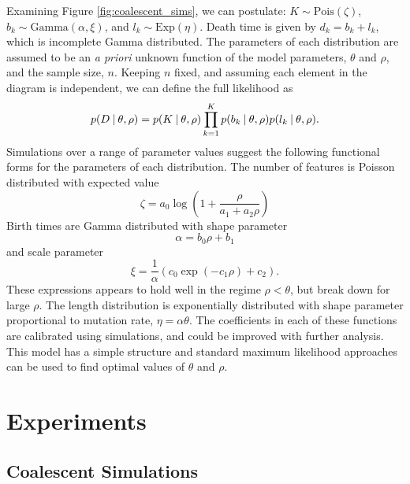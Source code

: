 Examining Figure \ref{fig:coalescent_sims}, we can postulate: $K \sim \mathrm{Pois}(\zeta)$, $b_k \sim \mathrm{Gamma}(\alpha,\xi)$, and $l_k \sim \mathrm{Exp}(\eta)$.
Death time is given by $d_k=b_k+l_k$, which is incomplete Gamma distributed.
The parameters of each distribution are assumed to be an \emph{a priori} unknown function of the model parameters, $\theta$ and $\rho$, and the sample size, $n$.
Keeping $n$ fixed, and assuming each element in the diagram is independent, we can define the full likelihood as
\begin{equation}
p(D \:\vert\: \theta,\rho) = p(K \:\vert\: \theta,\rho)\displaystyle\prod_{k=1}^{K}p(b_k \:\vert\: \theta,\rho)p(l_k  \:\vert\: \theta,\rho).
\end{equation}
Simulations over a range of parameter values suggest the following functional forms for the parameters of each distribution.
The number of features is Poisson distributed with expected value
\begin{equation}
\zeta=a_{0}\log\left(1+\frac{\rho}{a_{1}+a_{2}\rho}\right)
\end{equation}
Birth times are Gamma distributed with shape parameter
\begin{equation}
\alpha=b_{0}\rho+b_{1}
\end{equation}
and scale parameter
\begin{equation}
\xi = \frac{1}{\alpha}(c_{0}\exp(-c_{1}\rho)+c_{2}).
\end{equation}
These expressions appears to hold well in the regime $\rho<\theta$, but break down for large $\rho$.
The length distribution is exponentially distributed with shape parameter proportional to mutation rate, $\eta=\alpha\theta$.
The coefficients in each of these functions are calibrated using simulations, and could be improved with further analysis.
This model has a simple structure and standard maximum likelihood approaches can be used to find optimal values of $\theta$ and $\rho$.

\section{Experiments}
\label{sec:experiments}

\subsection{Coalescent Simulations}

